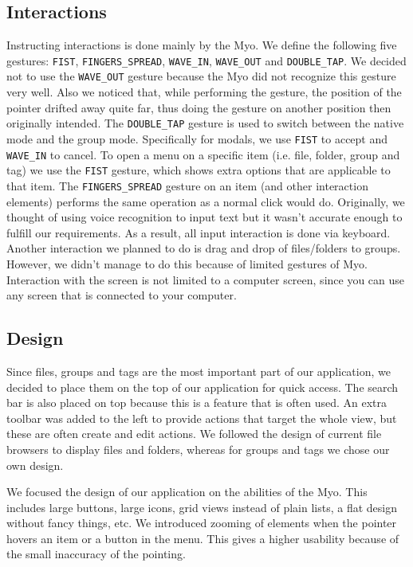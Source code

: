 \documentclass{article}
\begin{document}
\subsection{Interactions}
Instructing interactions is done mainly by the Myo. We define the following five gestures: \texttt{FIST}, \texttt{FINGERS\_SPREAD}, \texttt{WAVE\_IN}, \texttt{WAVE\_OUT} and \texttt{DOUBLE\_TAP}. We decided not to use the \texttt{WAVE\_OUT} gesture because the Myo did not recognize this gesture very well. Also we noticed that, while performing the gesture, the position of the pointer drifted away quite far, thus doing the gesture on another position then originally intended. The \texttt{DOUBLE\_TAP} gesture is used to switch between the native mode and the group mode. Specifically for modals, we use \texttt{FIST} to accept and \texttt{WAVE\_IN} to cancel. To open a menu on a specific item (i.e. file, folder, group and tag) we use the \texttt{FIST} gesture, which shows extra options that are applicable to that item. The \texttt{FINGERS\_SPREAD} gesture on an item (and other interaction elements) performs the same operation as a normal click would do. Originally, we thought of using voice recognition to input text but it wasn't accurate enough to fulfill our requirements. As a result, all input interaction is done via keyboard. Another interaction we planned to do is drag and drop of files/folders to groups. However, we didn't manage to do this because of limited gestures of Myo. Interaction with the screen is not limited to a computer screen, since you can use any screen that is connected to your computer.

\subsection{Design}

Since files, groups and tags are the most important part of our application, we decided to place them on the top of our application for quick access. The search bar is also placed on top because this is a feature that is often used. An extra toolbar was added to the left to provide actions that target the whole view, but these are often create and edit actions. We followed the design of current file browsers to display files and folders, whereas for groups and tags we chose our own design.

We focused the design of our application on the abilities of the Myo. This includes large buttons, large icons, grid views instead of plain lists, a flat design without fancy things, etc. We introduced zooming of elements when the pointer hovers an item or a button in the menu. This gives a higher usability because of the small inaccuracy of the pointing. 
\end{document}
